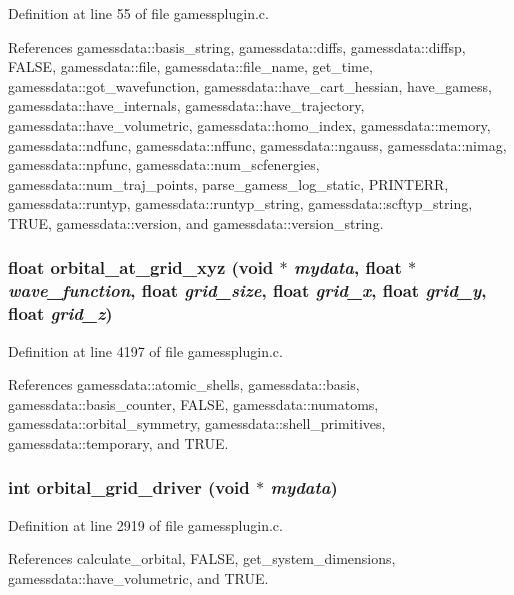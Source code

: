 Definition at line 55 of file gamessplugin.c.

References gamessdata::basis\_\-string, gamessdata::diffs, gamessdata::diffsp, FALSE, gamessdata::file, gamessdata::file\_\-name, get\_\-time, gamessdata::got\_\-wavefunction, gamessdata::have\_\-cart\_\-hessian, have\_\-gamess, gamessdata::have\_\-internals, gamessdata::have\_\-trajectory, gamessdata::have\_\-volumetric, gamessdata::homo\_\-index, gamessdata::memory, gamessdata::ndfunc, gamessdata::nffunc, gamessdata::ngauss, gamessdata::nimag, gamessdata::npfunc, gamessdata::num\_\-scfenergies, gamessdata::num\_\-traj\_\-points, parse\_\-gamess\_\-log\_\-static, PRINTERR, gamessdata::runtyp, gamessdata::runtyp\_\-string, gamessdata::scftyp\_\-string, TRUE, gamessdata::version, and gamessdata::version\_\-string.
\subsubsection{\setlength{\rightskip}{0pt plus 5cm}float orbital\_\-at\_\-grid\_\-xyz (void $\ast$ {\em mydata}, float $\ast$ {\em wave\_\-function}, float {\em grid\_\-size}, float {\em grid\_\-x}, float {\em grid\_\-y}, float {\em grid\_\-z})}\label{gamessplugin_8c_a40}




Definition at line 4197 of file gamessplugin.c.

References gamessdata::atomic\_\-shells, gamessdata::basis, gamessdata::basis\_\-counter, FALSE, gamessdata::numatoms, gamessdata::orbital\_\-symmetry, gamessdata::shell\_\-primitives, gamessdata::temporary, and TRUE.
\subsubsection{\setlength{\rightskip}{0pt plus 5cm}int orbital\_\-grid\_\-driver (void $\ast$ {\em mydata})}\label{gamessplugin_8c_a28}




Definition at line 2919 of file gamessplugin.c.

References calculate\_\-orbital, FALSE, get\_\-system\_\-dimensions, gamessdata::have\_\-volumetric, and TRUE.

